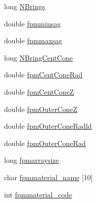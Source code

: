 \begin{DoxyCompactItemize}
long \hyperlink{structOPTPIAACMCDESIGN_ac59ca64b62c48d2b6717d31114dcbf71}{N\+Brings}
\item 
double \hyperlink{structOPTPIAACMCDESIGN_abd8c35ecd940017543133dd855b1ffe3}{fpmminsag}
\item 
double \hyperlink{structOPTPIAACMCDESIGN_a5fd5d4ca057083ad662b5abac47d5140}{fpmmaxsag}
\item 
long \hyperlink{structOPTPIAACMCDESIGN_a501fee866e60cc90794c6d4fcfd3bc3a}{N\+Bring\+Cent\+Cone}
\item 
double \hyperlink{structOPTPIAACMCDESIGN_a493c4bf7d5a9348fb6331bb2f41adacb}{fpm\+Cent\+Cone\+Rad}
\item 
double \hyperlink{structOPTPIAACMCDESIGN_afc48f92c305dcd5b0ed1b3571eae68c8}{fpm\+Cent\+Cone\+Z}
\item 
double \hyperlink{structOPTPIAACMCDESIGN_a4951d69d7b5188a02510b3815812906e}{fpm\+Outer\+Cone\+Z}
\item 
double \hyperlink{structOPTPIAACMCDESIGN_a0feae8a5f179899a7cbd57e49e1c52df}{fpm\+Outer\+Cone\+Radld}
\item 
double \hyperlink{structOPTPIAACMCDESIGN_a640ea4b5690796066d3fc69aae0b157b}{fpm\+Outer\+Cone\+Rad}
\item 
long \hyperlink{structOPTPIAACMCDESIGN_a02a2edaa7c78edec5ec36133783318a9}{fpmarraysize}
\item 
char \hyperlink{structOPTPIAACMCDESIGN_a229a4f5b2b0f11256ad6447aa7240c4a}{fpmmaterial\+\_\+name} \mbox{[}10\mbox{]}
\item 
int \hyperlink{structOPTPIAACMCDESIGN_a109986baab6ae4c894500a5f2e350677}{fpmmaterial\+\_\+code}
\end{DoxyCompactItemize}


